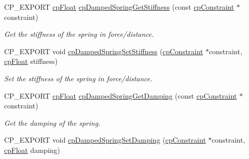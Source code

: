 \begin{DoxyCompactItemize}
\mbox{\label{group__cp_damped_spring_ga4f649481e8d9c0a166e9d9dc26fd1cdc}} 
C\+P\+\_\+\+E\+X\+P\+O\+RT \mbox{\hyperlink{group__basic_types_gac1ed65573e035bf892505768c852d8d3}{cp\+Float}} \mbox{\hyperlink{group__cp_damped_spring_ga4f649481e8d9c0a166e9d9dc26fd1cdc}{cp\+Damped\+Spring\+Get\+Stiffness}} (const \mbox{\hyperlink{structcp_constraint}{cp\+Constraint}} $\ast$constraint)
\begin{DoxyCompactList}\small\item\em Get the stiffness of the spring in force/distance. \end{DoxyCompactList}\item 
\mbox{\label{group__cp_damped_spring_gafb0a681c3c2ec31001bd55be1080beda}} 
C\+P\+\_\+\+E\+X\+P\+O\+RT void \mbox{\hyperlink{group__cp_damped_spring_gafb0a681c3c2ec31001bd55be1080beda}{cp\+Damped\+Spring\+Set\+Stiffness}} (\mbox{\hyperlink{structcp_constraint}{cp\+Constraint}} $\ast$constraint, \mbox{\hyperlink{group__basic_types_gac1ed65573e035bf892505768c852d8d3}{cp\+Float}} stiffness)
\begin{DoxyCompactList}\small\item\em Set the stiffness of the spring in force/distance. \end{DoxyCompactList}\item 
\mbox{\label{group__cp_damped_spring_gaa97fd3bd3901c0366d12bfc8308213b7}} 
C\+P\+\_\+\+E\+X\+P\+O\+RT \mbox{\hyperlink{group__basic_types_gac1ed65573e035bf892505768c852d8d3}{cp\+Float}} \mbox{\hyperlink{group__cp_damped_spring_gaa97fd3bd3901c0366d12bfc8308213b7}{cp\+Damped\+Spring\+Get\+Damping}} (const \mbox{\hyperlink{structcp_constraint}{cp\+Constraint}} $\ast$constraint)
\begin{DoxyCompactList}\small\item\em Get the damping of the spring. \end{DoxyCompactList}\item 
\mbox{\label{group__cp_damped_spring_ga88177eeb62c14005496c38c9b6d8669d}} 
C\+P\+\_\+\+E\+X\+P\+O\+RT void \mbox{\hyperlink{group__cp_damped_spring_ga88177eeb62c14005496c38c9b6d8669d}{cp\+Damped\+Spring\+Set\+Damping}} (\mbox{\hyperlink{structcp_constraint}{cp\+Constraint}} $\ast$constraint, \mbox{\hyperlink{group__basic_types_gac1ed65573e035bf892505768c852d8d3}{cp\+Float}} damping)

\end{DoxyCompactItemize}
